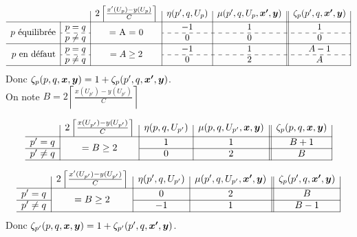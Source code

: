 \documentclass[twoside,11pt,openany,a4paper]{rapport}
\begin{document}
\begin{gather*}
  \begin{array}{r|c|c|c|c||c|}
    \multicolumn{2}{c|}{}
    & 2 \left\lceil \frac{x'(U_p)-y(U_p)}{C} \right\rceil
    & \eta(p',q,U_p)
    & \mu(p',q,U_p,\bs{x'},\bs{y})
    & \zeta_p(p',q,\bs{x'},\bs{y})
    \\ \hline
    \multirow{2}{*}{$p$ équilibrée}
    & p=q
    & \multirow{2}{*}{= A = 0}
    & -1
    & 1
    & 1
    \\ \cdashline{2-2}\cdashline{4-6}
    & p \ne q
    &
    & 0
    & 0
    & 0
    \\ \hline
    \multirow{2}{*}{$p$ en défaut}
    & p=q
    & \multirow{2}{*}{$= A \ge 2$}
    & -1
    & 1
    & A-1
    \\ \cdashline{2-2}\cdashline{4-6}
    & p \ne q
    &
    & 0
    & 2
    & A
    \\ \hline
  \end{array}
\end{gather*}
Donc $\zeta_p(p,q,\boldsymbol{x},\boldsymbol{y}) = 1 + \zeta_p(p',q,\boldsymbol{x'},\boldsymbol{y})$.
\\

On note $B = 2 \left\lceil \frac{\displaystyle x(U_{p'})-y(U_{p'})}{\displaystyle C} \right\rceil$

\begin{gather*}
  \begin{array}{r|c|c|c||c|}
    & 2 \left\lceil \frac{x(U_{p'})-y(U_{p'})}{C} \right\rceil
    & \eta(p,q,U_{p'})
    & \mu(p,q,U_{p'},\bs{x},\bs{y})
    & \zeta_p(p,q,\bs{x},\bs{y})
    \\ \hline
    p' = q
    & \multirow{2}{*}{$= B \ge 2$}
    & 1
    & 1
    & B + 1
    \\ \cline{1-1}\cline{3-5}
    p' \ne q
    &
    & 0
    & 2
    & B
    \\ \hline
  \end{array}
\end{gather*}

\begin{gather*}
  \begin{array}{r|c|c|c||c|}
    & 2 \left\lceil \frac{x'(U_{p'})-y(U_{p'})}{C} \right\rceil
    & \eta(p',q,U_{p'})
    & \mu(p',q,U_{p'},\bs{x'},\bs{y})
    & \zeta_p(p',q,\bs{x'},\bs{y})
    \\ \hline
    p' = q
    & \multirow{2}{*}{$= B \ge 2$}
    & 0
    & 2
    & B
    \\ \cline{1-1}\cline{3-5}
    p' \ne q
    &
    & -1
    & 1
    & B - 1
    \\ \hline
  \end{array}
\end{gather*}
Donc $\zeta_{p'}(p,q,\boldsymbol{x},\boldsymbol{y}) = 1 + \zeta_{p'}(p',q,\boldsymbol{x'},\boldsymbol{y})$.
\end{document}
